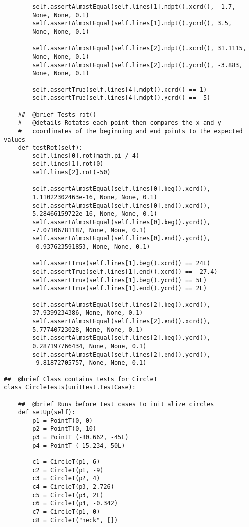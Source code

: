 \documentclass{article}
\begin{document}
\begin{lstlisting}
        self.assertAlmostEqual(self.lines[1].mdpt().xcrd(), -1.7,
        None, None, 0.1)
        self.assertAlmostEqual(self.lines[1].mdpt().ycrd(), 3.5,
        None, None, 0.1)
        
        self.assertAlmostEqual(self.lines[2].mdpt().xcrd(), 31.1115, 
        None, None, 0.1)
        self.assertAlmostEqual(self.lines[2].mdpt().ycrd(), -3.883, 
        None, None, 0.1)

        self.assertTrue(self.lines[4].mdpt().xcrd() == 1)
        self.assertTrue(self.lines[4].mdpt().ycrd() == -5)
        
    ##  @brief Tests rot()
    #   @details Rotates each point then compares the x and y  
    #   coordinates of the beginning and end points to the expected values
    def testRot(self):
        self.lines[0].rot(math.pi / 4)
        self.lines[1].rot(0)
        self.lines[2].rot(-50)

        self.assertAlmostEqual(self.lines[0].beg().xcrd(), 
        1.11022302463e-16, None, None, 0.1)
        self.assertAlmostEqual(self.lines[0].end().xcrd(), 
        5.28466159722e-16, None, None, 0.1)
        self.assertAlmostEqual(self.lines[0].beg().ycrd(), 
        -7.07106781187, None, None, 0.1)
        self.assertAlmostEqual(self.lines[0].end().ycrd(),
        -0.937623591853, None, None, 0.1)

        self.assertTrue(self.lines[1].beg().xcrd() == 24L)
        self.assertTrue(self.lines[1].end().xcrd() == -27.4)
        self.assertTrue(self.lines[1].beg().ycrd() == 5L)
        self.assertTrue(self.lines[1].end().ycrd() == 2L)

        self.assertAlmostEqual(self.lines[2].beg().xcrd(), 
        37.9399234386, None, None, 0.1)
        self.assertAlmostEqual(self.lines[2].end().xcrd(), 
        5.77740723028, None, None, 0.1)
        self.assertAlmostEqual(self.lines[2].beg().ycrd(), 
        0.287197766434, None, None, 0.1)
        self.assertAlmostEqual(self.lines[2].end().ycrd(), 
        -9.81872705757, None, None, 0.1)        
        
##  @brief Class contains tests for CircleT
class CircleTests(unittest.TestCase):
    
    ##  @brief Runs before test cases to initialize circles
    def setUp(self):
        p1 = PointT(0, 0)
        p2 = PointT(0, 10)
        p3 = PointT (-80.662, -45L)
        p4 = PointT (-15.234, 50L)

        c1 = CircleT(p1, 6)
        c2 = CircleT(p1, -9)
        c3 = CircleT(p2, 4)
        c4 = CircleT(p3, 2.726)
        c5 = CircleT(p3, 2L)
        c6 = CircleT(p4, -0.342)
        c7 = CircleT(p1, 0)
        c8 = CircleT("heck", [])


\end{lstlisting}
\end{document}
